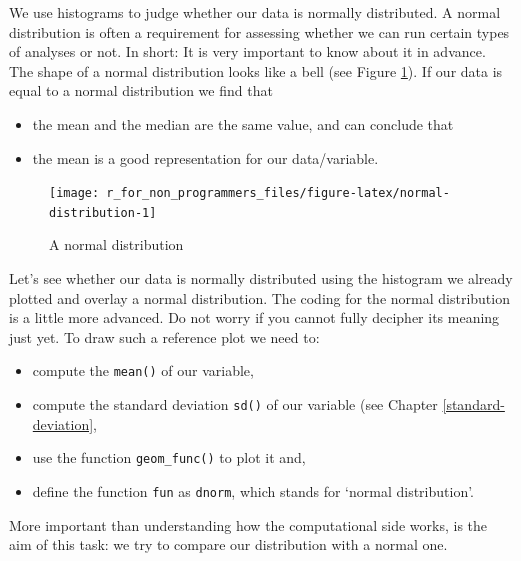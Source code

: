 \documentclass[
]{book}
\begin{document}
We use histograms to judge whether our data is normally distributed. A normal distribution is often a requirement for assessing whether we can run certain types of analyses or not. In short: It is very important to know about it in advance. The shape of a normal distribution looks like a bell (see Figure \ref{fig:normal-distribution}). If our data is equal to a normal distribution we find that

\begin{itemize}
\item
  the mean and the median are the same value, and can conclude that
\item
  the mean is a good representation for our data/variable.
\end{itemize}

\begin{figure}

{\centering \texttt{[image: r\_for\_non\_programmers\_files/figure-latex/normal-distribution-1]} 

}

\caption{A normal distribution}\label{fig:normal-distribution}
\end{figure}

Let's see whether our data is normally distributed using the histogram we already plotted and overlay a normal distribution. The coding for the normal distribution is a little more advanced. Do not worry if you cannot fully decipher its meaning just yet. To draw such a reference plot we need to:

\begin{itemize}
\item
  compute the \texttt{mean()} of our variable,
\item
  compute the standard deviation \texttt{sd()} of our variable (see Chapter \ref{standard-deviation},
\item
  use the function \texttt{geom\_func()} to plot it and,
\item
  define the function \texttt{fun} as \texttt{dnorm}, which stands for `normal distribution'.
\end{itemize}

More important than understanding how the computational side works, is the aim of this task: we try to compare our distribution with a normal one.
\end{document}
